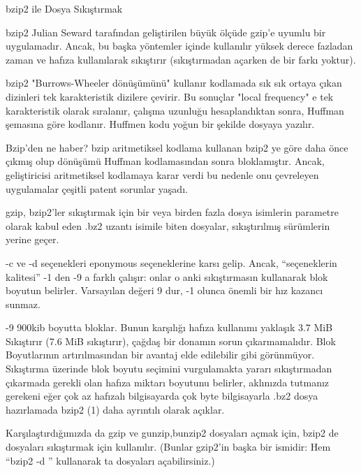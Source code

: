 \begin{section}{bzip2 ile Dosya Sıkıştırmak}

bzip2 Julian Seward tarafından geliştirilen büyük ölçüde gzip'e uyumlu bir uygulamadır. Ancak, bu başka yöntemler içinde kullanılır yüksek derece fazladan zaman ve hafıza kullanılarak sıkıştırır (sıkıştırmadan açarken de bir farkı yoktur).

bzip2 "Burrows-Wheeler dönüşümünü" kullanır kodlamada sık sık ortaya çıkan dizinleri tek karakteristik dizilere çevirir. Bu sonuçlar "local frequency" e tek karakteristik olarak sıralanır, çalışma uzunluğu hesaplandıktan sonra, Huffman şemasına göre kodlanır. Huffmen kodu yoğun bir şekilde dosyaya yazılır.

Bzip'den ne haber? bzip aritmetiksel kodlama kullanan bzip2 ye göre daha önce çıkmış olup dönüşümü Huffman kodlamasından sonra bloklamıştır. Ancak, geliştiricisi aritmetiksel kodlamaya karar verdi bu nedenle onu çevreleyen uygulamalar çeşitli patent sorunlar yaşadı.

gzip, bzip2'ler sıkıştırmak için bir veya birden fazla dosya isimlerin parametre olarak kabul eden .bz2 uzantı isimile biten dosyalar, sıkıştırılmış sürümlerin yerine geçer.

-c ve -d seçenekleri eponymous seçeneklerine karsı gelip. Ancak, “seçeneklerin kalitesi” -1 den -9 a farklı çalışır: onlar o anki sıkıştırmasın kullanarak blok boyutun belirler. Varsayılan değeri 9 dur, -1 olunca önemli bir hız kazancı sunmaz.

-9 900kib boyutta bloklar. Bunun karşılığı hafıza kullanımı yaklaşık 3.7 MiB
Sıkıştırır (7.6 MiB sıkıştırır), çağdaş bir donamın sorun çıkarmamalıdır. Blok
Boyutlarının artırılmasından bir avantaj elde edilebilir gibi görünmüyor. Sıkıştırma üzerinde blok boyutu seçimini vurgulamakta yararı sıkıştırmadan çıkarmada gerekli olan hafıza miktarı boyutunu belirler, aklınızda tutmanız gerekeni eğer çok az hafızalı bilgisayarda çok byte bilgisayarla .bz2 dosya hazırlamada bzip2 (1) daha ayrıntılı olarak açıklar.

Karşılaştırdığımızda da gzip ve gunzip,bunzip2 dosyaları açmak için, bzip2 de dosyaları sıkıştırmak için kullanılır. (Bunlar gzip2'in başka bir ismidir: Hem “bzip2 -d ” kullanarak ta dosyaları açabilirsiniz.)
\end{section}
